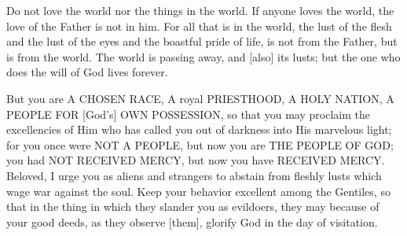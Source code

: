 \vspace{4\baselineskip}


\begin{scripture}[1 John 2:15-17]
    Do not love the world nor the things in the world. If anyone loves the world, the love of the Father is not in him.
    For all that is in the world, the lust of the flesh and the lust of the eyes and the boastful pride of life, is not from the Father, but is from the world.
    The world is passing away, and [also] its lusts; but the one who does the will of God lives forever.
\end{scripture}

\vspace{2\baselineskip}

\begin{scripture}[1 Peter 2:9-12]
    But you are A CHOSEN RACE, A royal PRIESTHOOD, A HOLY NATION, A PEOPLE FOR [God's] OWN POSSESSION, so that you may proclaim the excellencies of Him who has called you out of darkness into His marvelous light;
    for you once were NOT A PEOPLE, but now you are THE PEOPLE OF GOD; you had NOT RECEIVED MERCY, but now you have RECEIVED MERCY.
    Beloved, I urge you as aliens and strangers to abstain from fleshly lusts which wage war against the soul.
    Keep your behavior excellent among the Gentiles, so that in the thing in which they slander you as evildoers, they may because of your good deeds, as they observe [them], glorify God in the day of visitation.
\end{scripture}

\vspace{2\baselineskip}
